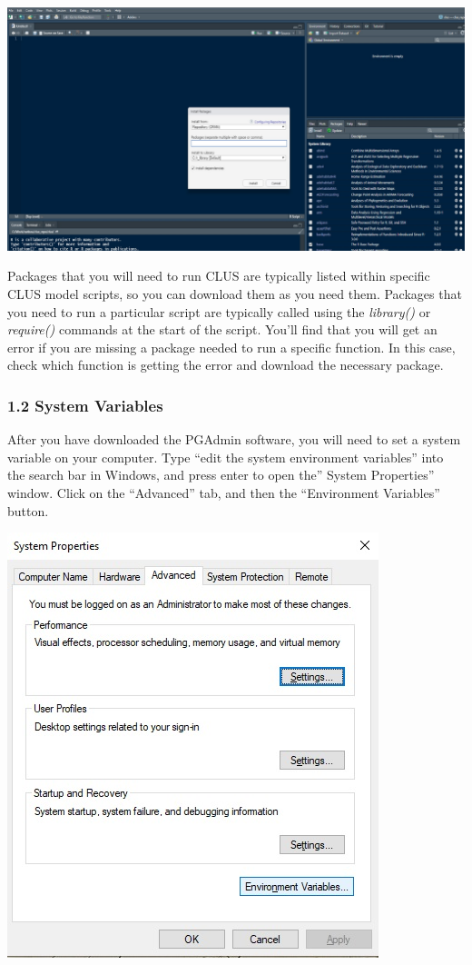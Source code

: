 \documentclass[
]{article}
\begin{document}
\includegraphics{images/rstudio_pakages.jpg}

Packages that you will need to run CLUS are typically listed within
specific CLUS model scripts, so you can download them as you need them.
Packages that you need to run a particular script are typically called
using the \emph{library()} or \emph{require()} commands at the start of
the script. You'll find that you will get an error if you are missing a
package needed to run a specific function. In this case, check which
function is getting the error and download the necessary package.

\hypertarget{system-variables}{%
\subsubsection{1.2 System Variables}\label{system-variables}}

After you have downloaded the PGAdmin software, you will need to set a
system variable on your computer. Type ``edit the system environment
variables'' into the search bar in Windows, and press enter to open
the'' System Properties'' window. Click on the ``Advanced'' tab, and
then the ``Environment Variables'' button.

\includegraphics{images/system_prop.jpg}
\end{document}
